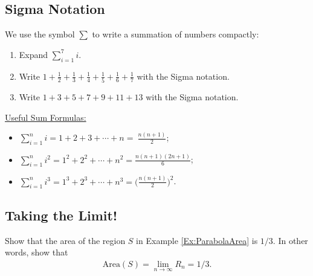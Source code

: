 \documentclass[12pt,a4paper]{article}
\newcommand{\ra}{\rightarrow}
\newcounter{example}[section]
\begin{document}
	\subsection{Sigma Notation}
	We use the symbol $\displaystyle \sum$ to write a summation of numbers compactly:
	
		\begin{center}
		\end{center}
	
	\begin{example}
	\begin{enumerate}[label=\textbf{\alph*)}]
	\item Expand $\displaystyle \sum_{i = 1}^7 i$.
	\item Write $\displaystyle 1 + \frac{1}{2} + \frac{1}{3} + \frac{1}{4} + \frac{1}{5} + \frac{1}{6} + \frac{1}{7}$ with the Sigma notation.
	\item Write $1 + 3 + 5 + 7 + 9 + 11 + 13$ with the Sigma notation.
	\end{enumerate}
	\end{example}
	
	\vfill
	
	\underline{Useful Sum Formulas:}
		
		\begin{itemize}
		\item $\displaystyle \sum_{i = 1}^n i = 1 + 2 + 3 + \cdots + n = \ \frac{n (n + 1)}{2}$;
		\item $\displaystyle  \sum_{i = 1}^n i^2 = 1^2 + 2^2 + \cdots + n^2 = \frac{n (n + 1) (2n + 1)}{6}$;
		\item $\displaystyle \sum_{i = 1}^n i^3 = 1^3 + 2^3 + \cdots + n^3 = \Big( \frac{n (n + 1)}{2} \Big)^2$.
		\end{itemize}
		
	\newpage
	
	\subsection{Taking the Limit!}
	
	\begin{example}
	Show that the area of the region $S$ in Example \ref{Ex:ParabolaArea} is $1/3$. In other words, show that
		\begin{align*}
		\mathrm{Area} (S) = \lim_{n \ra \infty} R_n = 1/3 .
		\end{align*}
	\end{example}
	
\end{document}

